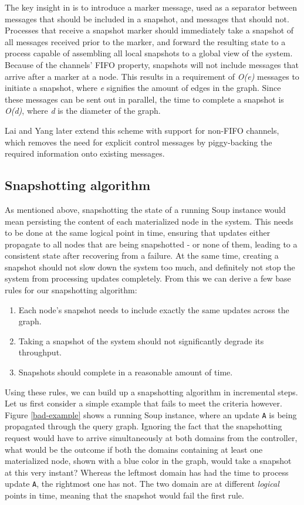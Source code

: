 \documentclass[b5paper]{report}
\begin{document}
The key insight in \cite{chandy-lamport} is to introduce a marker message, used
as a separator between messages that should be included in a snapshot, and
messages that should not. Processes that receive a snapshot marker should
immediately take a snapshot of all messages received prior to the marker, and
forward the resulting state to a process capable of assembling all local
snapshots to a global view of the system. Because of the channels' FIFO
property, snapshots will not include messages that arrive after a marker at a
node. This results in a requirement of \textit{O(e)} messages to initiate a
snapshot, where \textit{e} signifies the amount of edges in the graph. Since
these messages can be sent out in parallel, the time to complete a snapshot is
\textit{O(d)}, where \textit{d} is the diameter of the graph.

Lai and Yang \cite{lai-yang} later extend this scheme with support for non-FIFO
channels, which removes the need for explicit control messages by piggy-backing
the required information onto existing messages.

\subsection{Snapshotting algorithm}
As mentioned above, snapshotting the state of a running Soup instance would mean
persisting the content of each materialized node in the system. This needs to be
done at the same logical point in time, ensuring that updates either
propagate to all nodes that are being snapshotted - or none of them, leading to
a consistent state after recovering from a failure. At the same time,
creating a snapshot should not slow down the system too much, and definitely not
stop the system from processing updates completely. From this we can derive a
few base rules for our snapshotting algorithm:

\begin{enumerate}
  \item Each node's snapshot needs to include exactly the same updates across
    the graph.
  \item Taking a snapshot of the system should not significantly degrade its
    throughput.
  \item Snapshots should complete in a reasonable amount of time.
\end{enumerate}

Using these rules, we can build up a snapshotting algorithm in incremental
steps. Let us first consider a simple example that fails to meet the criteria
however. Figure \ref{bad-example} shows a running Soup instance, where an update
\texttt{A} is being propagated through the query graph. Ignoring the fact that
the snapshotting request would have to arrive simultaneously at both domains
from the controller, what would be the outcome if both the domains containing at
least one materialized node, shown with a blue color in the graph, would take
a snapshot at this very instant? Whereas the leftmost domain has had the time to
process update \texttt{A}, the rightmost one has not. The two domain are at
different \textit{logical} points in time, meaning that the snapshot would fail
the first rule.
\end{document}
